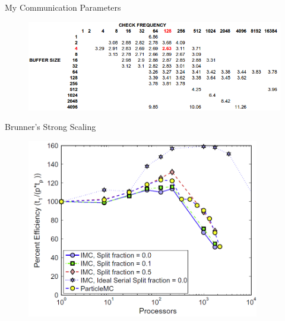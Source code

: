 \documentclass{beamer}
\begin{document}
\begin{frame}{My Communication Parameters}

  \begin{figure}[h!]
    \begin{center}
      \includegraphics[width=4.5in]{my_params.png}
    \end{center}
  \end{figure}

\end{frame}

\begin{frame}{Brunner's Strong Scaling}

  \begin{figure}[h!]
    \begin{center}
      \includegraphics[width=4in]{brunner_strong.png}
    \end{center}
  \end{figure}

\end{frame}
\end{document}
